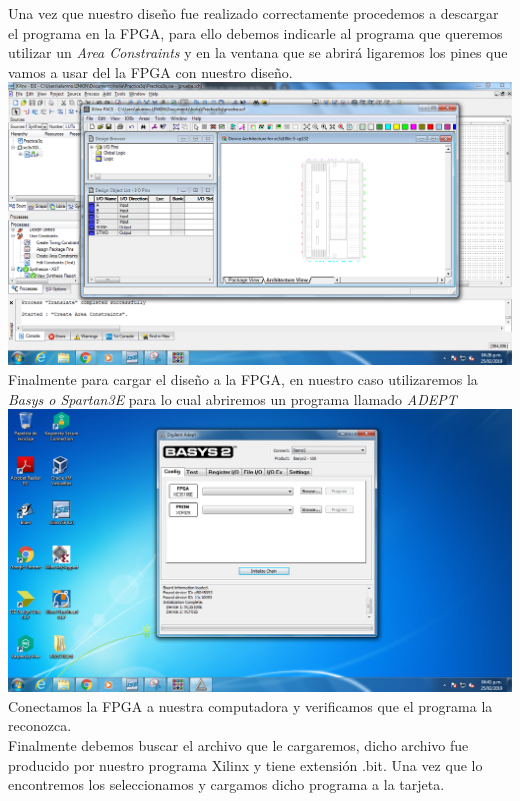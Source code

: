 \documentclass{mylib/reporteConCalif}
\begin{document}
Una vez que nuestro diseño fue realizado correctamente procedemos a descargar el programa en la FPGA, para ello debemos indicarle al programa que queremos utilizar un \textit{Area Constraints} y en la ventana que se abrirá ligaremos los pines que vamos a usar del la FPGA con nuestro diseño.\\

\includegraphics[width=15cm]{img/labdise_practica3/image7}\\

Finalmente para cargar el diseño a la FPGA, en nuestro caso utilizaremos la \textit{Basys o Spartan3E} para lo cual abriremos un programa llamado \textit{ADEPT} \\

\includegraphics[width=15cm]{img/labdise_practica3/image5}\\

Conectamos la FPGA a nuestra computadora y verificamos que el programa la reconozca. \\

Finalmente debemos buscar el archivo que le cargaremos, dicho archivo fue producido por nuestro programa Xilinx y tiene extensión .bit. Una vez que lo encontremos los seleccionamos y cargamos dicho programa a la tarjeta.\\
\end{document}
